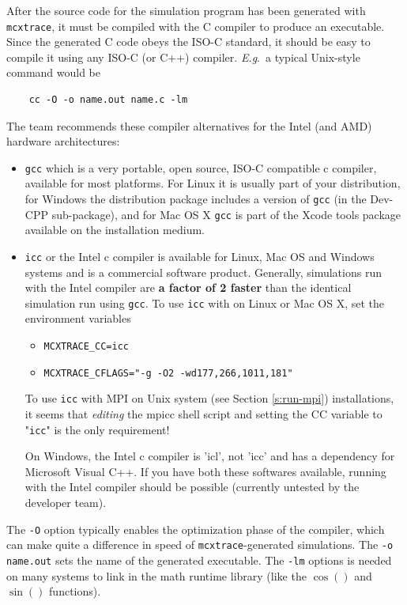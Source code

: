 After the source code for the simulation program has been generated with \texttt{mcxtrace},
it must be compiled with the C compiler to produce an executable.
Since the generated C code obeys the ISO-C standard, it should be easy
to compile it using any ISO-C (or C++) compiler. \textit{E.g}.\ a typical
Unix-style command would be
\begin{lstlisting}
    cc -O -o name.out name.c -lm
\end{lstlisting}
The \MCX team recommends these compiler alternatives for the Intel (and AMD)
hardware architectures:
\begin{itemize}
\item[\textbf{A}]{\verb+gcc+ which is a very portable, open source, ISO-C compatible
    c compiler, available for most platforms. For Linux it is usually part of
    your distribution, for Windows the \MCX distribution package includes a
    version of \verb+gcc+ (in the Dev-CPP sub-package), and for Mac OS X
    \verb+gcc+ is part of the Xcode tools package available on the installation
    medium.}
\item[\textbf{B}]{\verb+icc+ or the Intel c compiler is available for Linux, Mac OS
    and Windows systems and is a commercial software product. Generally,
    simulations run with the Intel compiler are \textbf{a factor of 2 faster} than
    the identical simulation run using \verb+gcc+. To use \verb+icc+ with \MCX
    on Linux or Mac OS X, set the environment variables
    \begin{itemize}
      \item{\verb+MCXTRACE_CC=icc+}
      \item{\verb+MCXTRACE_CFLAGS="-g -O2 -wd177,266,1011,181"+}
    \end{itemize}
    To use \verb+icc+ with MPI on Unix system (see Section \ref{s:run-mpi})
 installations, it seems that \emph{editing}
    the mpicc shell script and setting the CC variable to "\verb+icc+" is the
    only requirement!}
  On Windows, the Intel c compiler is 'icl', not 'icc' and has a dependency for
  Microsoft Visual C++. If you have both these softwares available, running
  \MCX with the Intel compiler should be possible (currently untested by the
  \MCX developer team).

\end{itemize}


The \verb+-O+ option typically enables the optimization phase of the compiler,
which can make quite a difference in speed of \texttt{mcxtrace}-generated simulations. The
\verb+-o name.out+ sets the name of the generated executable. The \verb+-lm+
options is needed on many systems to link in the math runtime library (like the
$\cos()$ and $\sin()$ functions). 

